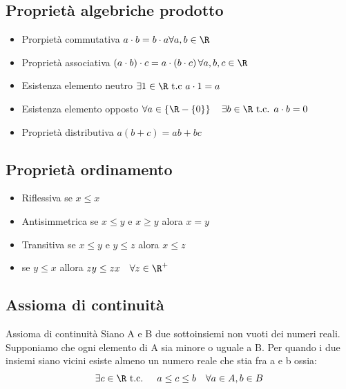 \subsection{Proprietà algebriche prodotto}
\label{sec:proprietàalgebricheprodotto}
\begin{itemize}
	\item Prorpietà commutativa $a \cdot b = b\cdot a \forall a,b  \in  \R$
	\item Proprietà associativa $\left( a\cdot b \right) \cdot c = a \cdot \left( b\cdot c \right) \forall a,b,c  \in  \R$
	\item Esistenza elemento neutro $\exists 1  \in \R \text{ t.c } a\cdot 1=a$
	\item Esistenza elemento opposto $\forall a  \in \left\{ \R-\left\{ 0 \right\}  \right\}  \quad \exists b  \in  \R \text{ t.c. } a\cdot b=0$
	\item Proprietà  distributiva $a\left( b+c \right) = ab+bc$
\end{itemize}
\subsection{Proprietà ordinamento}
\label{sub:proprietàordinamento}
\begin{itemize}
	\item Riflessiva se $x\le x$
	\item Antisimmetrica se $x \le y$ e $x \ge y$ alora $x=y$
	\item Transitiva se $x \le y$ e $y \le z$ alora $x\le z$
	\item se $y \le x$ allora  $zy \le zx \quad \forall z  \in \R^{+}$
\end{itemize}
\subsection{Assioma di continuità}
\label{sub:assiomadicontinuità}\phantom{.}

\begin{assioma}{Assioma di continuità}
	Siano A e B due sottoinsiemi non vuoti dei numeri reali. Supponiamo che ogni elemento di A sia minore o uguale a B. Per quando i due insiemi siano vicini esiste almeno un numero reale che stia fra a e b ossia:
	\[
		\exists c  \in \R \text{ t.c. } \quad a\le c \le b \quad \forall a  \in A, b  \in B
	\]
\end{assioma}

